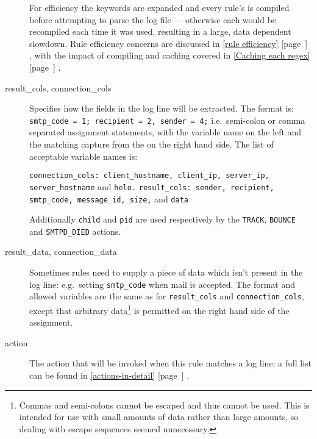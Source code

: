 \documentclass[a4paper,12pt,draft]{article}
\newcommand{\refwithpage}[1]{%
    \empty{}\ref{#1} [page~\pageref{#1}]%
}
\newcommand{\sectionref}[1]{%
    \textsection{}\refwithpage{#1}%
}
\newcommand{\tab}[0]{%
    \hspace*{2em}%
}
\begin{document}
\begin{description}
        For efficiency the keywords are expanded and every rule's \regex{}
        is compiled before attempting to parse the log file --- otherwise
        each \regex{} would be recompiled each time it was used, resulting
        in a large, data dependent slowdown.  Rule efficiency concerns are
        discussed in \sectionref{rule efficiency}, with the impact of
        compiling and caching \regexes{} covered in \sectionref{Caching
        each regex}.

    \item [result\_cols, connection\_cols] Specifies how the fields in the
        log line will be extracted.  The format is:
        \newline \tab{} \texttt{smtp\_code = 1; recipient = 2, sender = 4;}
        \newline i.e.\ semi-colon or comma separated assignment statements,
        with the variable name on the left and the matching capture from
        the \regex{} on the right hand side.  The list of acceptable
        variable names is:

        \texttt{connection\_cols: client\_hostname, client\_ip, server\_ip,
        \newline \tab{} server\_hostname} and \texttt{helo.\newline}
        \texttt{result\_cols: sender, recipient, smtp\_code, message\_id,
        \newline \tab{} size,} and \texttt{data}

        Additionally \texttt{child} and \texttt{pid} are used respectively
        by the \texttt{TRACK}, \texttt{BOUNCE} and \texttt{SMTPD\_DIED}
        actions.

    \item [result\_data, connection\_data] Sometimes rules need to supply a
        piece of data which isn't present in the log line: e.g.\ setting
        \texttt{smtp\_code} when mail is accepted.  The format and allowed
        variables are the same as for \texttt{result\_cols} and
        \texttt{connection\_cols}, except that arbitrary
        data\footnote{Commas and semi-colons cannot be escaped and thus
        cannot be used.  This is intended for use with small amounts of
        data rather than large amounts, so dealing with escape sequences
        seemed unnecessary.} is permitted on the right hand side of the
        assignment.

    \item [action] The action that will be invoked when this rule matches a
        log line; a full list can be found in
        \sectionref{actions-in-detail}.


\end{description}
\end{document}
